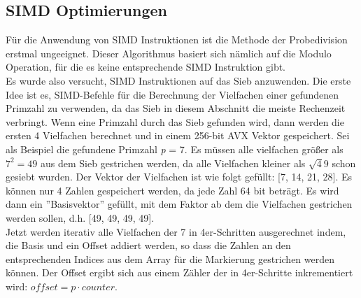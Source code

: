 \documentclass[course=erap]{aspdoc}
\begin{document}
\subsection{SIMD Optimierungen}
Für die Anwendung von SIMD Instruktionen ist die Methode der Probedivision erstmal ungeeignet. 
Dieser Algorithmus basiert sich nämlich auf die Modulo Operation, für die es keine entsprechende SIMD Instruktion gibt.\\
Es wurde also versucht, SIMD Instruktionen auf das Sieb anzuwenden. Die erste Idee ist es, SIMD-Befehle für die Berechnung der Vielfachen einer gefundenen Primzahl zu verwenden, da das Sieb in diesem Abschnitt die meiste Rechenzeit verbringt. Wenn eine Primzahl durch das Sieb gefunden wird, dann werden die ersten 4 Vielfachen berechnet und in einem 256-bit AVX Vektor gespeichert. Sei als Beispiel die gefundene Primzahl \textit{p} = 7. Es müssen alle vielfachen größer als $7^2 = 49$ aus dem Sieb gestrichen werden, da alle Vielfachen kleiner als $\sqrt49$ schon gesiebt wurden. Der Vektor der Vielfachen ist wie folgt gefüllt: [7, 14, 21, 28]. Es können nur 4 Zahlen gespeichert werden, da jede Zahl 64 bit beträgt. Es wird dann ein ''Basisvektor'' gefüllt, mit dem Faktor ab dem die Vielfachen gestrichen werden sollen, d.h. [49, 49, 49, 49].\\Jetzt werden iterativ alle Vielfachen der 7 in 4er-Schritten ausgerechnet indem, die Basis und ein Offset addiert werden, so dass die Zahlen an den entsprechenden Indices aus dem Array für die Markierung gestrichen werden können. 
Der Offset ergibt sich aus einem Zähler der in 4er-Schritte inkrementiert wird: $offset = p \cdot counter$. 
\end{document}
